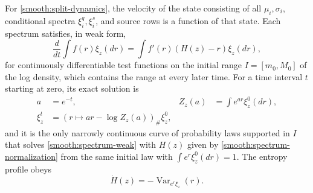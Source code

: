 For \cref{smooth:split-dynamics}, the velocity of the state consisting of all $\mu_i,\sigma_i$, conditional spectra $\xi_i^q,\xi_i^s$, and source rows is a function of that state. Each spectrum satisfies, in weak form,
\begin{equation}
 \frac{d}{dt}\int f(r)\xi_z(dr)
 =\int f'(r)(H(z)-r)\xi_z(dr),
 \label{smooth:spectrum-weak}
\end{equation}
for continuously differentiable test functions on the initial range $I=[m_0,M_0]$ of the log density, which contains the range at every later time. For a time interval $t$ starting at zero, its exact solution is
\begin{equation}
 \begin{aligned}
 a&=e^{-t},& Z_z(a)&=\int e^{ar}\xi_z^0(dr),\\
 \xi_z^t&=(r\mapsto ar-\log Z_z(a))_\#\xi_z^0,
 \end{aligned}
 \label{smooth:spectrum-solution}
\end{equation}
and it is the only narrowly continuous curve of probability laws supported in $I$ that solves \cref{smooth:spectrum-weak} with $H(z)$ given by \cref{smooth:spectrum-normalization} from the same initial law with $\int e^r\xi^0_z(dr)=1$. The entropy profile obeys
\begin{equation}
 \dot H(z)=-\operatorname{Var}_{e^r\xi_z}(r).
 \label{smooth:entropy-rate}
\end{equation}
